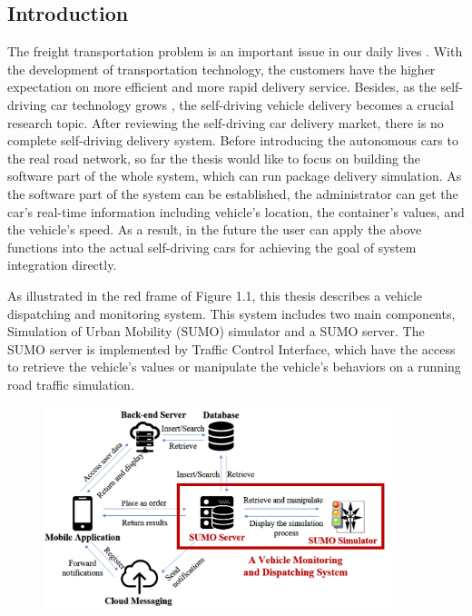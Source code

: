 \documentclass[12pt]{ksthesis}
\begin{document}
\begin{thesis}\large {
\chapter{Introduction} \label{Chap:Introduction}

The freight transportation problem is an important issue in our daily lives \cite{Anand2012}. With the development of transportation technology, the customers have the higher expectation on more efficient and more rapid delivery service. Besides, as the self-driving car technology grows \cite{Lutin2013}, the self-driving vehicle delivery becomes a crucial research topic. After reviewing the self-driving car delivery market, there is no complete self-driving delivery system. 
Before introducing the autonomous cars to the real road network, so far the thesis would like to focus on building the software part of the whole system, which can run package delivery simulation. As the software part of the system can be established, the administrator can get the car’s real-time information including vehicle’s location, the container’s values, and the vehicle’s speed. As a result, in the future the user can apply the above functions into the actual self-driving cars for achieving the goal of system integration directly.

As illustrated in the red frame of Figure 1.1, this thesis describes a vehicle dispatching and monitoring system. This system includes two main components, Simulation of Urban Mobility (SUMO) simulator and a SUMO server. The SUMO server is implemented by Traffic Control Interface, which have the access to retrieve the vehicle’s values or manipulate the vehicle’s behaviors on a running road traffic simulation.

\begin{figure}[t]
\centering
\includegraphics[width=0.9\textwidth]{./Thesis_figures/F1-1_System_Design_Overview.PNG}


\end{figure}}
\end{thesis}
\end{document}

